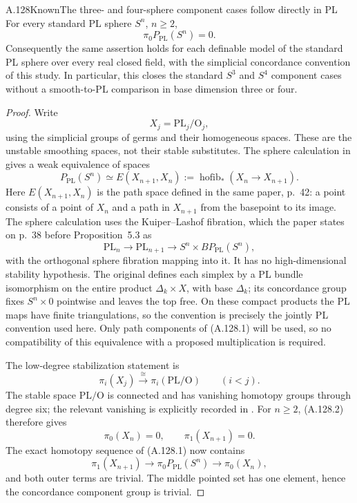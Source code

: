 \begin{saresult}{A.128}{Known}{The three- and four-sphere component cases follow directly in PL}
For every standard PL sphere $S^n$, $n\geq2$,
\[
 \pi_0 P_{\mathrm{PL}}(S^n)=0.
\]
Consequently the same assertion holds for each definable model of
the standard PL sphere over every real closed field, with the
simplicial concordance convention of this study. In particular,
this closes the standard $S^3$ and $S^4$ component cases without
a smooth-to-PL comparison in base dimension three or four.
\end{saresult}
\begin{proof}
Write
\[
 X_j=\mathrm{PL}_j/\mathrm O_j,
\]
using the simplicial groups of germs and their homogeneous spaces.
These are the unstable smoothing spaces, not their stable
substitutes. The sphere calculation in
\cite[\S6, p.~43, equation~(1), following Proposition~5.3]{BurgheleaLashof1974II}
gives a weak equivalence of spaces
\[
 P_{\mathrm{PL}}(S^n)
 \simeq E(X_{n+1},X_n)
 :=\operatorname{hofib}_{*}(X_n\longrightarrow X_{n+1}).
                                                        \tag{A.128.1}
\]
Here $E(X_{n+1},X_n)$ is the path space defined in the same
paper, p.~42: a point consists of a point of $X_n$ and a path
in $X_{n+1}$ from the basepoint to its image. The sphere calculation
uses the Kuiper--Lashof fibration, which the paper states on
p.~38 before Proposition~5.3 as
\[
 \mathrm{PL}_n\longrightarrow\mathrm{PL}_{n+1}
 \longrightarrow S^n\times B P_{\mathrm{PL}}(S^n),
\]
with the orthogonal sphere fibration mapping into it. It has no
high-dimensional stability hypothesis. The original
\cite[Theorem~1 and definitions, pp.~243--244]{KuiperLashof1966II}
defines each simplex by a PL bundle isomorphism on the entire
product $\Delta_k\times X$, with base $\Delta_k$; its concordance
group fixes $S^n\times0$ pointwise and leaves the top free.
On these compact products the PL maps have finite triangulations,
so the convention is precisely the jointly PL convention used here.
Only path components of
(A.128.1) will be used, so no compatibility of this equivalence
with a proposed multiplication is required.

The low-degree stabilization statement
\cite[\S5, p.~37, formula~(3)]{BurgheleaLashof1974II}
is
\[
 \pi_i(X_j)\xrightarrow{\ \cong\ }
 \pi_i(\mathrm{PL}/\mathrm O)\qquad(i<j).
                                                        \tag{A.128.2}
\]
The stable space $\mathrm{PL}/\mathrm O$ is connected and has
vanishing homotopy groups through degree six; the relevant
vanishing is explicitly recorded in
\cite[Annex~C, p.~318, calculation following Theorem~5.4]{KirbySiebenmann1977}.
For $n\geq2$, (A.128.2) therefore gives
\[
 \pi_0(X_n)=0,\qquad \pi_1(X_{n+1})=0.
\]
The exact homotopy sequence of (A.128.1) now contains
\[
 \pi_1(X_{n+1})\longrightarrow
 \pi_0 P_{\mathrm{PL}}(S^n)\longrightarrow\pi_0(X_n),
\]
and both outer terms are trivial. The middle pointed set has
one element, hence the concordance component group is trivial.


\end{proof}
